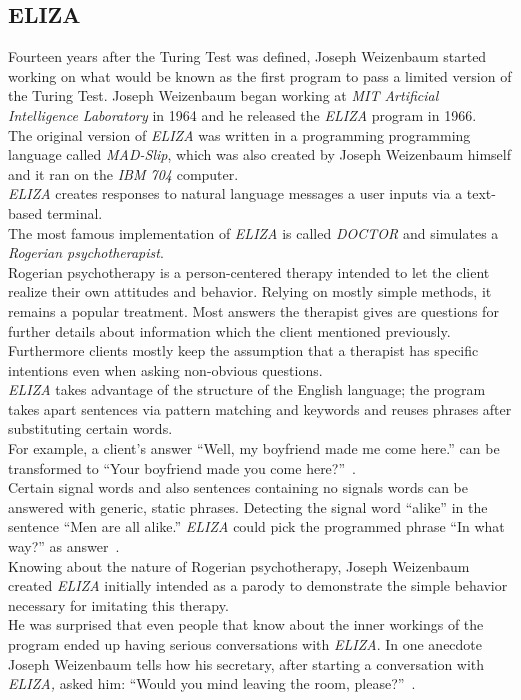 \subsection{ELIZA}
\label{eliza}

Fourteen years after the Turing Test was defined, Joseph Weizenbaum started working on what would be known as the first program to pass a limited version of the Turing Test.
Joseph Weizenbaum began working at \emph{MIT Artificial Intelligence Laboratory} in 1964 and he released the \emph{ELIZA} program in 1966.
\\

The original version of \emph{ELIZA} was written in a programming programming language called \emph{MAD-Slip},
which was also created by Joseph Weizenbaum himself and it ran on the \emph{IBM 704} computer.
\\
\emph{ELIZA} creates responses to natural language messages a user inputs via a text-based terminal.
\\

The most famous implementation of \emph{ELIZA} is called \emph{DOCTOR} and simulates a \emph{Rogerian psychotherapist}.
\\
Rogerian psychotherapy is a person-centered therapy intended to let the client realize their own attitudes and behavior.
Relying on mostly simple methods, it remains a popular treatment.
Most answers the therapist gives are questions for further details about information which the client mentioned previously.
Furthermore clients mostly keep the assumption that a therapist has specific intentions even when asking non-obvious questions.
\\

\emph{ELIZA} takes advantage of the structure of the English language;
the program takes apart sentences via pattern matching and keywords and reuses phrases after substituting certain words.
\\
For example, a client's answer ``Well, my boyfriend made me come here.'' can be transformed to ``Your boyfriend made you come here?''~\cite{elizatest}.
\\
Certain signal words and also sentences containing no signals words can be answered with generic, static phrases.
Detecting the signal word ``alike'' in the sentence ``Men are all alike.'' \emph{ELIZA} could pick the programmed phrase ``In what way?'' as answer~\cite{elizatest}.
\\

Knowing about the nature of Rogerian psychotherapy, Joseph Weizenbaum created \emph{ELIZA} initially intended as a parody to demonstrate the simple behavior necessary for imitating this therapy.
\\
He was surprised that even people that know about the inner workings of the program ended up having serious conversations with \emph{ELIZA}.
In one anecdote Joseph Weizenbaum tells how his secretary, after starting a conversation with \emph{ELIZA,} asked him: ``Would you mind leaving the room, please?''~\cite[5]{weizenbaum}.
\\


